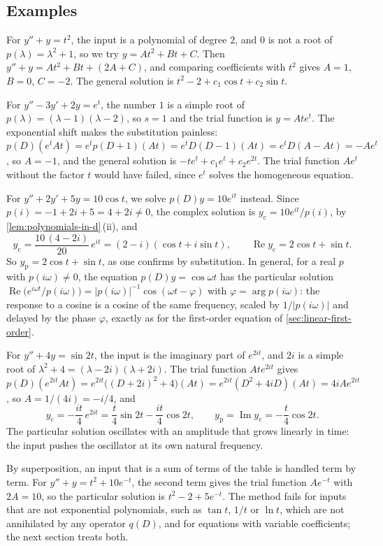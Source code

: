 \subsection{Examples}

For $y''+y=t^2$, the input is a polynomial of degree $2$, and $0$ is not a root of $p(\lambda)=\lambda^2+1$, so we try $y=At^2+Bt+C$. Then $y''+y=At^2+Bt+(2A+C)$, and comparing coefficients with $t^2$ gives $A=1$, $B=0$, $C=-2$. The general solution is $t^2-2+c_1\cos t+c_2\sin t$.

For $y''-3y'+2y=e^t$, the number $1$ is a simple root of $p(\lambda)=(\lambda-1)(\lambda-2)$, so $s=1$ and the trial function is $y=Ate^t$. The exponential shift makes the substitution painless: $p(D)(e^tAt)=e^tp(D+1)(At)=e^tD(D-1)(At)=e^tD(A-At)=-Ae^t$, so $A=-1$, and the general solution is $-te^t+c_1e^t+c_2e^{2t}$. The trial function $Ae^t$ without the factor $t$ would have failed, since $e^t$ solves the homogeneous equation.

For $y''+2y'+5y=10\cos t$, we solve $p(D)y=10e^{it}$ instead. Since $p(i)=-1+2i+5=4+2i\ne0$, the complex solution is $y_{\mathrm c}=10e^{it}/p(i)$, by \cref{lem:polynomials-in-d}\,(ii), and
\[
y_{\mathrm c}=\frac{10\,(4-2i)}{20}\,e^{it}=(2-i)(\cos t+i\sin t),\qquad\operatorname{Re}y_{\mathrm c}=2\cos t+\sin t .
\]
So $y_{\mathrm p}=2\cos t+\sin t$, as one confirms by substitution. In general, for a real $p$ with $p(i\omega)\ne0$, the equation $p(D)y=\cos\omega t$ has the particular solution $\operatorname{Re}\bigl(e^{i\omega t}/p(i\omega)\bigr)=|p(i\omega)|^{-1}\cos(\omega t-\varphi)$ with $\varphi=\arg p(i\omega)$: the response to a cosine is a cosine of the same frequency, scaled by $1/|p(i\omega)|$ and delayed by the phase $\varphi$, exactly as for the first-order equation of \cref{sec:linear-first-order}.

For $y''+4y=\sin2t$, the input is the imaginary part of $e^{2it}$, and $2i$ is a simple root of $\lambda^2+4=(\lambda-2i)(\lambda+2i)$. The trial function $Ate^{2it}$ gives $p(D)(e^{2it}At)=e^{2it}\bigl((D+2i)^2+4\bigr)(At)=e^{2it}(D^2+4iD)(At)=4iAe^{2it}$, so $A=1/(4i)=-i/4$, and
\[
y_{\mathrm c}=-\frac{it}4\,e^{2it}=\frac t4\sin2t-\frac{it}4\cos2t,\qquad y_{\mathrm p}=\operatorname{Im}y_{\mathrm c}=-\frac t4\cos2t .
\]
The particular solution oscillates with an amplitude that grows linearly in time: the input pushes the oscillator at its own natural frequency.

By superposition, an input that is a sum of terms of the table is handled term by term. For $y''+y=t^2+10e^{-t}$, the second term gives the trial function $Ae^{-t}$ with $2A=10$, so the particular solution is $t^2-2+5e^{-t}$. The method fails for inputs that are not exponential polynomials, such as $\tan t$, $1/t$ or $\ln t$, which are not annihilated by any operator $q(D)$, and for equations with variable coefficients; the next section treats both.

